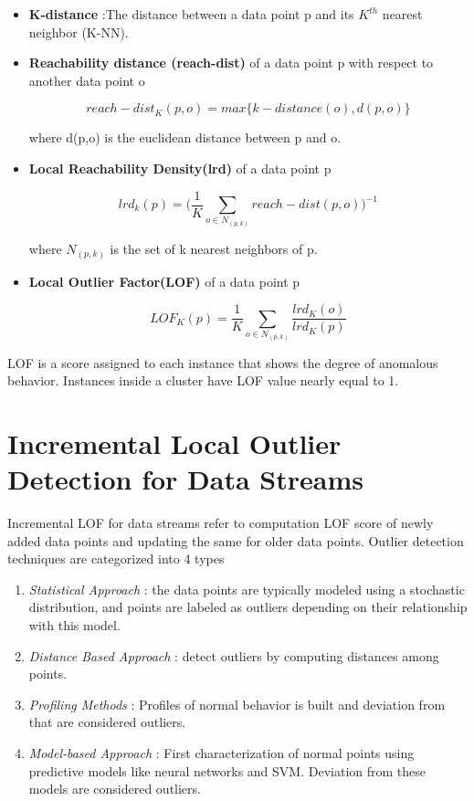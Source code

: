 \begin{itemize}
	\item \textbf{K-distance} :The distance between a data point p
	and its $K^{th}$ nearest neighbor (K-NN).
	
	\item \textbf{Reachability distance (reach-dist)} of a data point p
	with respect to another data point o
	
	\[ reach-dist_K(p,o)=max\{k-distance(o),d(p,o)\}  \]
	
	where d(p,o) is the euclidean distance between p
	and o.
	
	
	\item \textbf{Local Reachability Density(lrd)}  of a data point p
	
	
	\[  lrd_k(p) =  \bigg( \frac{1}{K} \sum_{o \in N_{(p,k)}} reach-dist(p,o)   \bigg)^{-1}  \]
	
	
	where $N_{(p,k)}$ is the set of k nearest neighbors of p.
	
	\item
	\textbf{Local Outlier Factor(LOF)}  of a data point p
	
	\[  LOF_K(p) = \frac{1}{K} \sum_{o \in N_{(p,k)}} \frac{lrd_K(o)}{lrd_K(p)}  \]
	
\end{itemize}

\par LOF is a score assigned to each instance that shows the degree of anomalous behavior. Instances inside a cluster have LOF value nearly equal to 1.


\section{Incremental Local Outlier Detection for Data Streams}
Incremental LOF for data streams refer to computation LOF score of newly added data points and updating the same for older data points. Outlier detection techniques are categorized into 4 types

\begin{enumerate}
	\item \textit{Statistical Approach} : the data points are typically modeled using a stochastic distribution, and points are labeled as outliers depending on their relationship with this model.
	
	\item \textit{Distance Based Approach} : detect outliers by computing distances among points.
	
	\item \textit{Profiling Methods} : Profiles of normal behavior is built and deviation from that are considered outliers.
	
	\item \textit{Model-based Approach} : First characterization of normal points using predictive models like neural networks and SVM. Deviation from these models are considered outliers.
	
	
\end{enumerate}

